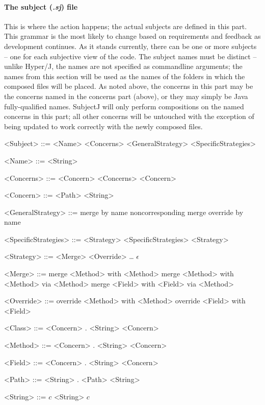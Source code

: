 \documentclass[11pt,letterpaper]{article}
\begin{document}
    \paragraph{The subject (\emph{.sj}) file}
    This is where the action happens; the actual subjects are defined in this part. This grammar is the most likely to change based on requirements and feedback as development continues. As it stands currently, there can be one or more subjects -- one for each subjective view of the code. The subject names must be distinct -- unlike Hyper/J, the names are not specified as commandline arguments; the names from this section will be used as the names of the folders in which the composed files will be placed. As noted above, the concerns in this part may be the concerns named in the concerns part (above), or they may simply be Java fully-qualified names. SubjectJ will only perform compositions on the named concerns in this part; all other concerns will be untouched with the exception of being updated to work correctly with the newly composed files.
    \begin{grammar}
        <Subject> ::= <Name> <Concerns> <GeneralStrategy> <SpecificStrategies>

        <Name> ::= <String>

        <Concerns> ::= <Concern> <Concerns>
        \alt <Concern>

        <Concern> ::= <Path>
        \alt <String>

        <GeneralStrategy> ::= merge by name
        \alt noncorresponding merge
        \alt override by name

        <SpecificStrategies> ::= <Strategy> <SpecificStrategies>
        \alt <Strategy>

        <Strategy> ::= <Merge>
        \alt <Override>
        \alt \ldots
        \alt $\epsilon$

        <Merge> ::= merge <Method> with <Method>
        \alt merge <Method> with <Method> via <Method>
        \alt merge <Field> with <Field> via <Method>

        <Override> ::= override <Method> with <Method>
        \alt override <Field> with <Field>

        <Class> ::= <Concern> . <String>
        \alt <Concern>

        <Method> ::= <Concern> . <String>
        \alt <Concern>

        <Field> ::= <Concern> . <String>
        \alt <Concern>

        <Path> ::= <String> . <Path>
        \alt <String>

        <String> ::= $c$ <String>
        \alt $c$
    \end{grammar}
\end{document}
